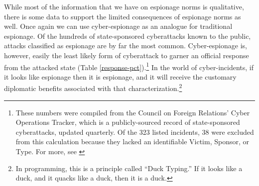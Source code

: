 \documentclass[12pt]{extarticle}
\begin{document}
While most of the information that we have on espionage norms is qualitative, there is some data to support the limited consequences of espionage norms as well. Once again we can use cyber-espionage as an analogue for traditional espionage. Of the hundreds of state-sponsored cyberattacks known to the public, attacks classified as espionage are by far the most common. Cyber-espionage is, however, easily the least likely form of cyberattack to garner an official response from the attacked state (Table \ref{response-pct}).\footnote{These numbers were compiled from the Council on Foreign Relations' Cyber Operations Tracker, which is a publicly-sourced record of state-sponsored cyberattacks, updated quarterly. Of the 323 listed incidents, 38 were excluded from this calculation because they lacked an identifiable Victim, Sponsor, or Type. For more, see \cite{council_on_foreign_relations_new_2019}} In the world of cyber-incidents, if it looks like espionage then it is espionage, and it will receive the customary diplomatic benefits associated with that characterization.\footnote{In programming, this is a principle called \enquote{Duck Typing.} If it looks like a duck, and it quacks like a duck, then it is a duck.}



\end{document}
